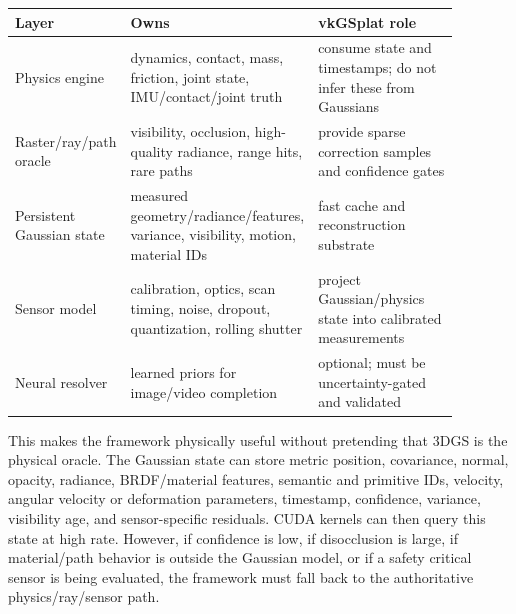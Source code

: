 \documentclass[11pt]{article}
\begin{document}
\begin{center}
\small
\begin{tabular}{p{0.20\linewidth}p{0.34\linewidth}p{0.34\linewidth}}
\toprule
Layer & Owns & vkGSplat role \\
\midrule
Physics engine & dynamics, contact, mass, friction, joint state, IMU/contact/joint truth & consume state and timestamps; do not infer these from Gaussians \\
Raster/ray/path oracle & visibility, occlusion, high-quality radiance, range hits, rare paths & provide sparse correction samples and confidence gates \\
Persistent Gaussian state & measured geometry/radiance/features, variance, visibility, motion, material IDs & fast cache and reconstruction substrate \\
Sensor model & calibration, optics, scan timing, noise, dropout, quantization, rolling shutter & project Gaussian/physics state into calibrated measurements \\
Neural resolver & learned priors for image/video completion & optional; must be uncertainty-gated and validated \\
\bottomrule
\end{tabular}
\end{center}

This makes the framework physically useful without pretending that 3DGS is the
physical oracle. The Gaussian state can store metric position, covariance,
normal, opacity, radiance, BRDF/material features, semantic and primitive IDs,
velocity, angular velocity or deformation parameters, timestamp, confidence,
variance, visibility age, and sensor-specific residuals. CUDA kernels can then
query this state at high rate. However, if confidence is low, if disocclusion is
large, if material/path behavior is outside the Gaussian model, or if a safety
critical sensor is being evaluated, the framework must fall back to the
authoritative physics/ray/sensor path.
\end{document}
